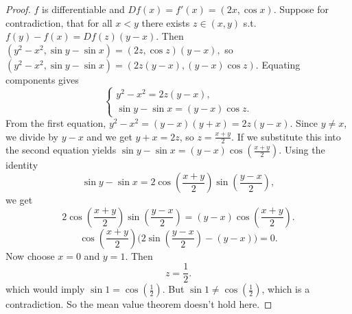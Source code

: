 \documentclass{article}
\begin{document}
\begin{proof}
$f$ is differentiable and $Df(x)=f'(x)=(2x,\cos x).$ Suppose for contradiction, that for all $x<y$ there exists $z\in(x,y)$ s.t. $f(y)-f(x)=Df(z)(y-x).$ Then $(y^2-x^2,\sin y-\sin x)=(2z,\cos z)(y-x),$ so $(y^2-x^2,\sin y-\sin x)=(2z(y-x),(y-x)\cos z).$ Equating components gives
\[
\begin{cases}
y^2-x^2=2z(y-x),\\[6pt]
\sin y-\sin x=(y-x)\cos z.
\end{cases}
\]
From the first equation, $y^2-x^2=(y-x)(y+x)=2z(y-x).$ Since $y\neq x$, we divide by $y-x$ and we get $y+x=2z$, so $z=\frac{x+y}{2}.$ If we substitute this into the second equation yields $\sin y-\sin x=(y-x)\cos\!\left(\frac{x+y}{2}\right).$
Using the identity
\[
\sin y-\sin x
=2\cos\!\left(\frac{x+y}{2}\right)\sin\!\left(\frac{y-x}{2}\right),
\]
we get
\[
2\cos\!\left(\frac{x+y}{2}\right)\sin\!\left(\frac{y-x}{2}\right)
=(y-x)\cos\!\left(\frac{x+y}{2}\right).
\]
\[
\cos\!\left(\frac{x+y}{2}\right)
\Big(2\sin\!\left(\frac{y-x}{2}\right)-(y-x)\Big)=0.
\]
Now choose $x=0$ and $y=1$. Then
\[
z=\frac{1}{2}.
\]
which would imply $\sin1=\cos\!\left(\frac12\right).$
But $\sin1\neq\cos\!\left(\frac12\right)$, which is a contradiction.
So the mean value theorem doesn't hold here. 
\end{proof}
\end{document}
